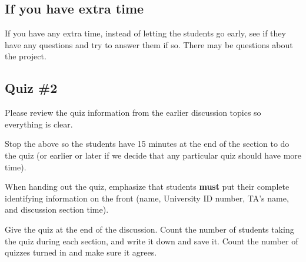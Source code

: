 \documentclass[12pt]{article}
\begin{document}
    \subsection{If you have extra time}
  
      If you have any extra time, instead of letting the students go early,
    see if they have any questions and try to answer them if so.  There may
    be questions about the project.

    \subsection{Quiz \#2}

      Please review the quiz information from the earlier discussion topics
    so everything is clear.

      Stop the above so the students have 15 minutes at the end of the section
    to do the quiz (or earlier or later if we decide that any particular
    quiz should have more time).

      When handing out the quiz, emphasize that students \textbf{must} put
    their complete identifying information on the front (name, University ID
    number, TA's name, and discussion section time).

      Give the quiz at the end of the discussion.  Count the number of
    students taking the quiz during each section, and write it down and save
    it.  Count the number of quizzes turned in and make sure it agrees.
\end{document}
